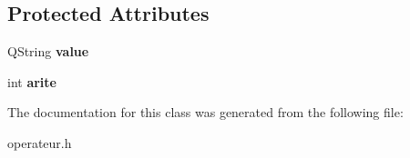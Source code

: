 \subsection*{Protected Attributes}
\begin{DoxyCompactItemize}
\item 
Q\+String {\bfseries value}\hypertarget{class_operateur_a5bca78f28e8de7848dabbb53152d549a}{}\label{class_operateur_a5bca78f28e8de7848dabbb53152d549a}

\item 
int {\bfseries arite}\hypertarget{class_operateur_a5158f9da883ae20151d9f3c5bc891bc6}{}\label{class_operateur_a5158f9da883ae20151d9f3c5bc891bc6}

\end{DoxyCompactItemize}


The documentation for this class was generated from the following file\+:\begin{DoxyCompactItemize}
\item 
operateur.\+h\end{DoxyCompactItemize}
